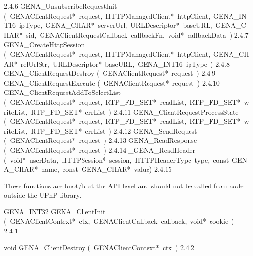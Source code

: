 \documentclass{article}
\begin{document}
\begin{cxxentry}
\begin{cxxentry}
\begin{cxxnames}
        {}
        {2.4.6}
        {GENA\_UnsubscribeRequestInit}
        {(\ GENAClientRequest*\ request,\ HTTPManagedClient*\ httpClient,\ GENA\_INT16\ ipType,\ GENA\_CHAR*\ serverUrl,\ URLDescriptor*\ baseURL,\ GENA\_CHAR*\ sid,\ GENAClientRequestCallback\ callbackFn,\ void*\ callbackData\ )}
        {}
        {2.4.7}
        {GENA\_CreateHttpSession}
        {(\ GENAClientRequest*\ request,\ HTTPManagedClient*\ httpClient,\ GENA\_CHAR*\ relUrlStr,\ URLDescriptor*\ baseURL,\ GENA\_INT16\ ipType\ )}
        {}
        {2.4.8}
        {GENA\_ClientRequestDestroy}
        {(\ GENAClientRequest*\ request\ )}
        {}
        {2.4.9}
        {GENA\_ClientRequestExecute}
        {(\ GENAClientRequest*\ request\ )}
        {}
        {2.4.10}
        {GENA\_ClientRequestAddToSelectList}
        {(\ GENAClientRequest*\ request,\ RTP\_FD\_SET*\ readList,\ RTP\_FD\_SET*\ writeList,\ RTP\_FD\_SET*\ errList\ )}
        {}
        {2.4.11}
        {GENA\_ClientRequestProcessState}
        {(\ GENAClientRequest*\ request,\ RTP\_FD\_SET*\ readList,\ RTP\_FD\_SET*\ writeList,\ RTP\_FD\_SET*\ errList\ )}
        {}
        {2.4.12}
        {GENA\_SendRequest}
        {(\ GENAClientRequest*\ request\ )}
        {}
        {2.4.13}
        {GENA\_ReadResponse}
        {(\ GENAClientRequest*\ request\ )}
        {}
        {2.4.14}
        {\_GENA\_ReadHeader}
        {(\ void*\ userData,\ HTTPSession*\ session,\ HTTPHeaderType\ type,\ const\ GENA\_CHAR*\ name,\ const\ GENA\_CHAR*\ value)}
        {}
        {2.4.15}
\end{cxxnames}
\begin{cxxdoc}
These functions are \<b\>not\</b\> at the API level and should not be called from
code outside the UPnP library. 
\end{cxxdoc}
\begin{cxxfunction}
{GENA\_INT32}
        {GENA\_ClientInit}
        {(\ GENAClientContext*\ ctx,\ GENAClientCallback\ callback,\ void*\ cookie\ )}
        {}
        {2.4.1}
\end{cxxfunction}
\begin{cxxfunction}
{void}
        {GENA\_ClientDestroy}
        {(\ GENAClientContext*\ ctx\ )}
        {}
        {2.4.2}

\end{cxxfunction}
\end{cxxentry}
\end{cxxentry}
\end{document}
